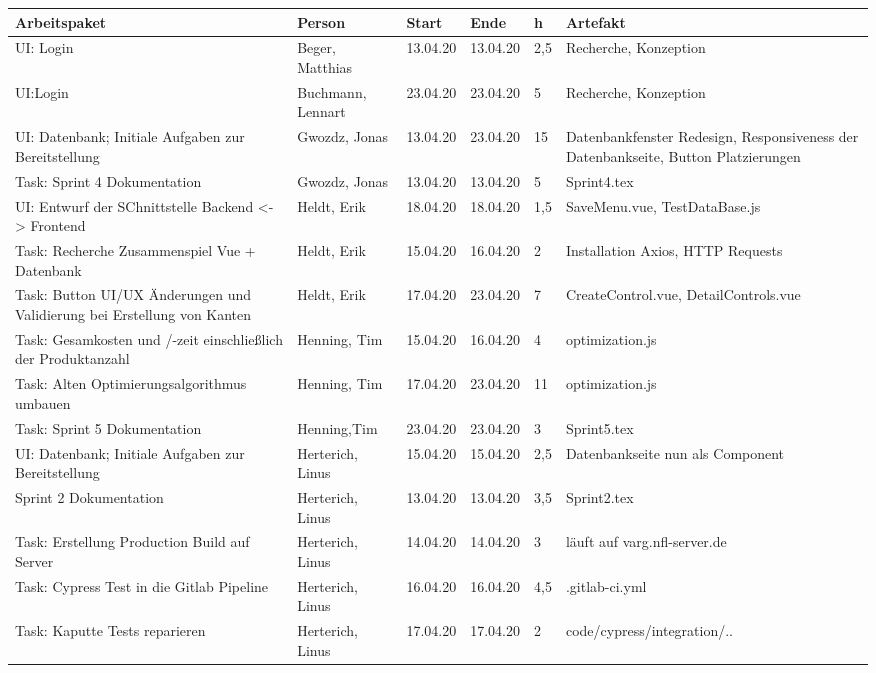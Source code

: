 \begin{longtable}{|p{4cm}|p{2cm}|p{1.2cm}|p{1.2cm}|p{0.7cm}|p{3.8cm}|}
        \hline
	Arbeitspaket & Person & Start & Ende & h & Artefakt\\
        \hline
	UI: Login & Beger, Matthias & 13.04.20 & 13.04.20 & 2,5 & Recherche, Konzeption\\ \hline
	UI:Login & Buchmann, Lennart & 23.04.20 & 23.04.20 & 5 & Recherche, Konzeption\\ \hline
UI: Datenbank; Initiale Aufgaben zur Bereitstellung & Gwozdz, Jonas  & 13.04.20 & 23.04.20 & 15 & Datenbankfenster Redesign, Responsiveness der Datenbankseite, Button Platzierungen \\ \hline
 Task: Sprint 4 Dokumentation & Gwozdz, Jonas  & 13.04.20  & 13.04.20 & 5 & Sprint4.tex \\ \hline
UI: Entwurf der SChnittstelle Backend <-> Frontend & Heldt, Erik  & 18.04.20 & 18.04.20  & 1,5 & SaveMenu.vue, TestDataBase.js \\ \hline
Task: Recherche Zusammenspiel Vue + Datenbank & Heldt, Erik  & 15.04.20  & 16.04.20  & 2 & Installation Axios, HTTP Requests \\ \hline
Task: Button UI/UX Änderungen und Validierung bei Erstellung von Kanten & Heldt, Erik  & 17.04.20 &23.04.20 & 7 & CreateControl.vue, DetailControls.vue\\ \hline
Task: Gesamkosten und /-zeit einschließlich der Produktanzahl & Henning, Tim  & 15.04.20  & 16.04.20  & 4 & optimization.js \\ \hline
Task: Alten Optimierungsalgorithmus umbauen & Henning,  Tim  & 17.04.20 & 23.04.20  & 11 & optimization.js\\ \hline
Task: Sprint 5 Dokumentation & Henning,Tim  & 23.04.20  & 23.04.20  & 3 & Sprint5.tex \\ \hline
UI: Datenbank; Initiale Aufgaben zur Bereitstellung &  Herterich, Linus  & 15.04.20  & 15.04.20 &  2,5 & Datenbankseite nun als Component \\ \hline
Sprint 2 Dokumentation  &  Herterich, Linus& 13.04.20 & 13.04.20 & 3,5 & Sprint2.tex \\ \hline
Task: Erstellung Production Build auf Server & Herterich, Linus  & 14.04.20  & 14.04.20 & 3 & läuft auf varg.nfl-server.de \\ \hline
Task: Cypress Test in die Gitlab Pipeline & Herterich, Linus  & 16.04.20 & 16.04.20 & 4,5 & .gitlab-ci.yml\\ \hline
Task: Kaputte Tests reparieren & Herterich, Linus  & 17.04.20  & 17.04.20  & 2 &  code/cypress/integration/.. \\ \hline

\end{longtable}
